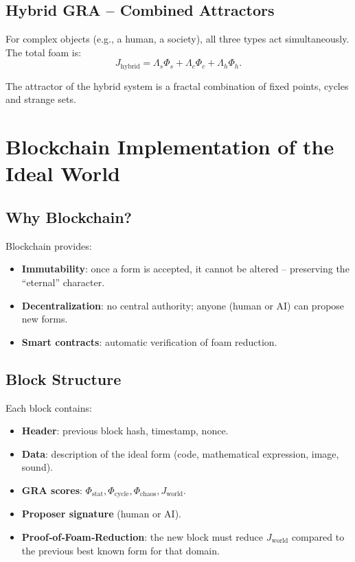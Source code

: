 \documentclass[12pt,a4paper]{article}
\begin{document}
\subsection{Hybrid GRA – Combined Attractors}

For complex objects (e.g., a human, a society), all three types act simultaneously. The total foam is:
\[
J_{\text{hybrid}} = \Lambda_s \Phi_s + \Lambda_c \Phi_c + \Lambda_h \Phi_h.
\]

The attractor of the hybrid system is a fractal combination of fixed points, cycles and strange sets.

\section{Blockchain Implementation of the Ideal World}

\subsection{Why Blockchain?}
Blockchain provides:
\begin{itemize}
    \item \textbf{Immutability}: once a form is accepted, it cannot be altered – preserving the “eternal” character.
    \item \textbf{Decentralization}: no central authority; anyone (human or AI) can propose new forms.
    \item \textbf{Smart contracts}: automatic verification of foam reduction.
\end{itemize}

\subsection{Block Structure}
Each block contains:
\begin{itemize}
    \item \textbf{Header}: previous block hash, timestamp, nonce.
    \item \textbf{Data}: description of the ideal form (code, mathematical expression, image, sound).
    \item \textbf{GRA scores}: \(\Phi_{\text{stat}}, \Phi_{\text{cycle}}, \Phi_{\text{chaos}}, J_{\text{world}}\).
    \item \textbf{Proposer signature} (human or AI).
    \item \textbf{Proof‑of‑Foam‑Reduction}: the new block must reduce \(J_{\text{world}}\) compared to the previous best known form for that domain.
\end{itemize}
\end{document}
